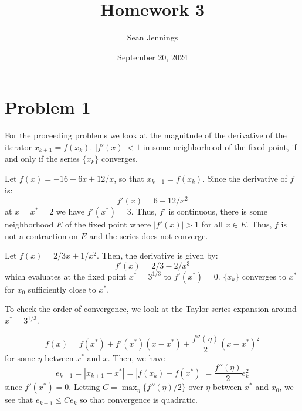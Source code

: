\documentclass{homework}
\title{Homework 3}
\author{Sean Jennings}
\date{September 20, 2024}
\begin{document}
\maketitle

\section{Problem 1}
For the proceeding problems we look at the magnitude of the derivative of 
the iterator $x_{k+1} = f(x_k)$. $|f'(x)| < 1$ in some neighborhood of the
fixed point, if and only if the series $\{x_k\}$ converges.

\begin{letterenum}
\item Let $f(x) = -16 + 6x  + 12 / x$, so that $x_{k+1} = f(x_k)$. Since the
derivative of $f$ is:
\begin{equation*}
    f'(x) = 6 - 12 / x^2
\end{equation*}
at $x=x^*=2$ we have $f'(x^*) = 3$. Thus, $f'$ is continuous, there is some neighborhood $E$
of the fixed point where $|f'(x)| > 1$ for all $x \in E$. Thus, $f$ is not a contraction on
$E$ and the series does not converge.

\item Let $f(x) = 2/3 x + 1/ x^2$. Then, the derivative is given by:
\begin{equation*}
    f'(x) = 2/3 - 2 / x^3
\end{equation*}
which evaluates at the fixed point $x^* = 3^{1/3}$ to $f'(x^*) = 0$. $\{x_k\}$ converges
to $x^*$ for $x_0$ sufficiently close to $x^*$.

To check the order of convergence, we look at the Taylor series expansion around $x^* = 3^{1/3}$.

\begin{equation*}
    f(x) = f(x^*) + f'(x^*) (x - x^*) + \frac{f''(\eta)}{2} (x - x^*)^2
\end{equation*}
for some $\eta$ between $x^*$ and $x$. Then, we have
\begin{equation*}
    e_{k+1} = |x_{k+1} - x^*| = | f(x_k) - f(x^*)| = \frac{f''(\eta)}{2} e_k^2
\end{equation*}
since $f'(x^*) = 0$. Letting $C = \max_{\eta}\{f''(\eta)/2\}$ over $\eta$ between $x^*$ and $x_0$,
we see that $e_{k+1} \leq C e_k$ so that convergence is quadratic.


\end{letterenum}
\end{document}
